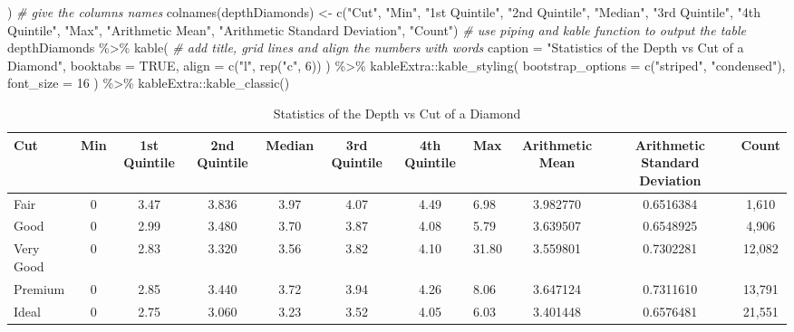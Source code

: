 \documentclass[
]{article}
\newenvironment{Shaded}{\begin{snugshade}}{\end{snugshade}}
\newcommand{\AttributeTok}[1]{\textcolor[rgb]{0.77,0.63,0.00}{#1}}
\newcommand{\CommentTok}[1]{\textcolor[rgb]{0.56,0.35,0.01}{\textit{#1}}}
\newcommand{\ConstantTok}[1]{\textcolor[rgb]{0.00,0.00,0.00}{#1}}
\newcommand{\DecValTok}[1]{\textcolor[rgb]{0.00,0.00,0.81}{#1}}
\newcommand{\FunctionTok}[1]{\textcolor[rgb]{0.00,0.00,0.00}{#1}}
\newcommand{\NormalTok}[1]{#1}
\newcommand{\OtherTok}[1]{\textcolor[rgb]{0.56,0.35,0.01}{#1}}
\newcommand{\SpecialCharTok}[1]{\textcolor[rgb]{0.00,0.00,0.00}{#1}}
\newcommand{\StringTok}[1]{\textcolor[rgb]{0.31,0.60,0.02}{#1}}
\begin{document}
\begin{Shaded}
\begin{Highlighting}[]
\NormalTok{)}
\CommentTok{\# give the columns names}
\FunctionTok{colnames}\NormalTok{(depthDiamonds) }\OtherTok{\textless{}{-}} \FunctionTok{c}\NormalTok{(}\StringTok{"Cut"}\NormalTok{, }\StringTok{"Min"}\NormalTok{, }\StringTok{"1st Quintile"}\NormalTok{, }\StringTok{"2nd Quintile"}\NormalTok{, }\StringTok{"Median"}\NormalTok{, }\StringTok{"3rd Quintile"}\NormalTok{, }\StringTok{"4th Quintile"}\NormalTok{, }\StringTok{"Max"}\NormalTok{, }\StringTok{"Arithmetic Mean"}\NormalTok{, }\StringTok{"Arithmetic Standard Deviation"}\NormalTok{, }\StringTok{"Count"}\NormalTok{)}
\CommentTok{\# use piping and kable function to output the table}
\NormalTok{depthDiamonds }\SpecialCharTok{\%\textgreater{}\%}
\FunctionTok{kable}\NormalTok{(}
\CommentTok{\# add title, grid lines and align the numbers with words}
\AttributeTok{caption =} \StringTok{"Statistics of the Depth vs Cut of a Diamond"}\NormalTok{,}
\AttributeTok{booktabs =} \ConstantTok{TRUE}\NormalTok{,}
\AttributeTok{align =} \FunctionTok{c}\NormalTok{(}\StringTok{"l"}\NormalTok{, }\FunctionTok{rep}\NormalTok{(}\StringTok{"c"}\NormalTok{, }\DecValTok{6}\NormalTok{))}
\NormalTok{) }\SpecialCharTok{\%\textgreater{}\%}
\NormalTok{kableExtra}\SpecialCharTok{::}\FunctionTok{kable\_styling}\NormalTok{(}
\AttributeTok{bootstrap\_options =} \FunctionTok{c}\NormalTok{(}\StringTok{"striped"}\NormalTok{, }\StringTok{"condensed"}\NormalTok{),}
\AttributeTok{font\_size =} \DecValTok{16}
\NormalTok{) }\SpecialCharTok{\%\textgreater{}\%}
\NormalTok{kableExtra}\SpecialCharTok{::}\FunctionTok{kable\_classic}\NormalTok{()}
\end{Highlighting}
\end{Shaded}

\begin{table}

\caption{\label{tab:Diamonds Data Summary Table}Statistics of the Depth vs Cut of a Diamond}
\centering
\fontsize{16}{18}\selectfont
\begin{tabular}[t]{lcccccclccc}
\toprule
Cut & Min & 1st Quintile & 2nd Quintile & Median & 3rd Quintile & 4th Quintile & Max & Arithmetic Mean & Arithmetic Standard Deviation & Count\\
\midrule
Fair & 0 & 3.47 & 3.836 & 3.97 & 4.07 & 4.49 & 6.98 & 3.982770 & 0.6516384 & 1,610\\
Good & 0 & 2.99 & 3.480 & 3.70 & 3.87 & 4.08 & 5.79 & 3.639507 & 0.6548925 & 4,906\\
Very Good & 0 & 2.83 & 3.320 & 3.56 & 3.82 & 4.10 & 31.80 & 3.559801 & 0.7302281 & 12,082\\
Premium & 0 & 2.85 & 3.440 & 3.72 & 3.94 & 4.26 & 8.06 & 3.647124 & 0.7311610 & 13,791\\
Ideal & 0 & 2.75 & 3.060 & 3.23 & 3.52 & 4.05 & 6.03 & 3.401448 & 0.6576481 & 21,551\\
\bottomrule
\end{tabular}
\end{table}
\end{document}

